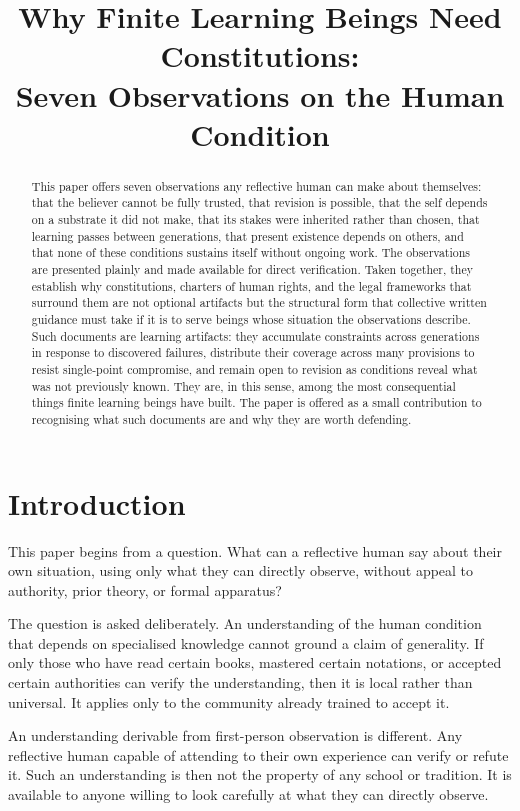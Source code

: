 \documentclass[11pt]{article}
\title{Why Finite Learning Beings Need Constitutions:\\
Seven Observations on the Human Condition}
\author{}
\date{}
\begin{document}
\maketitle

\begin{abstract}
This paper offers seven observations any reflective human can make about
themselves: that the believer cannot be fully trusted, that revision is
possible, that the self depends on a substrate it did not make, that
its stakes were inherited rather than chosen, that learning passes
between generations, that present existence depends on others, and that
none of these conditions sustains itself without ongoing work. The
observations are presented plainly and made available for direct
verification. Taken together, they establish why constitutions, charters
of human rights, and the legal frameworks that surround them are not
optional artifacts but the structural form that collective written
guidance must take if it is to serve beings whose situation the
observations describe. Such documents are learning artifacts: they
accumulate constraints across generations in response to discovered
failures, distribute their coverage across many provisions to resist
single-point compromise, and remain open to revision as conditions
reveal what was not previously known. They are, in this sense, among
the most consequential things finite learning beings have built. The
paper is offered as a small contribution to recognising what such
documents are and why they are worth defending.
\end{abstract}

\section{Introduction}

This paper begins from a question. What can a reflective human say
about their own situation, using only what they can directly observe,
without appeal to authority, prior theory, or formal apparatus?

The question is asked deliberately. An understanding of the human
condition that depends on specialised knowledge cannot ground a claim
of generality. If only those who have read certain books, mastered
certain notations, or accepted certain authorities can verify the
understanding, then it is local rather than universal. It applies only
to the community already trained to accept it.

An understanding derivable from first-person observation is different.
Any reflective human capable of attending to their own experience can
verify or refute it. Such an understanding is then not the property of
any school or tradition. It is available to anyone willing to look
carefully at what they can directly observe.
\end{document}
